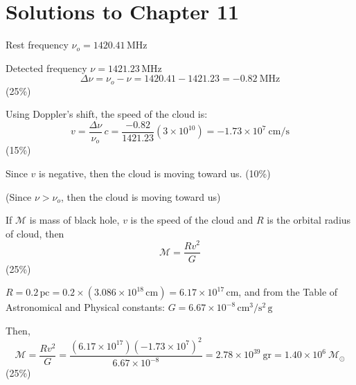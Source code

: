 \clearpage
\section*{Solutions to Chapter 11}

Rest frequency $\nu_o = 1420.41$\,MHz

Detected frequency $\nu = 1421.23$\,MHz
\[
  \Delta\nu = \nu_o - \nu = 1420.41 - 1421.23 = -0.82\ \mathrm{MHz}
\]
\hfill(25\%)

Using Doppler's shift, the speed of the cloud is:
\[
  v = \frac{\Delta\nu}{\nu_o}\,c
    = \frac{-0.82}{1421.23}\left(3\times10^{10}\right)
    = -1.73\times10^{7}\ \mathrm{cm/s}
\]
\hfill(15\%)

Since $v$ is negative, then the cloud is moving toward us. \hfill(10\%)

(Since $\nu > \nu_o$, then the cloud is moving toward us)

If $\mathcal{M}$ is mass of black hole, $v$ is the speed of the cloud and $R$
is the orbital radius of cloud, then
\[
  \mathcal{M} = \frac{Rv^2}{G}
\]
\hfill(25\%)

$R = 0.2\,\mathrm{pc} = 0.2 \times (3.086 \times 10^{18}\,\mathrm{cm})
= 6.17 \times 10^{17}\,\mathrm{cm}$, and from the Table of Astronomical and
Physical constants: $G = 6.67 \times 10^{-8}\,\mathrm{cm}^3/\mathrm{s}^2\,\mathrm{g}$

Then,
\[
  \mathcal{M} = \frac{Rv^2}{G}
  = \frac{\left(6.17\times10^{17}\right)\left(-1.73\times10^{7}\right)^2}{6.67\times10^{-8}}
  = 2.78\times10^{39}\ \mathrm{gr} = 1.40\times10^{6}\ \mathcal{M}_\odot
\]
\hfill(25\%)

